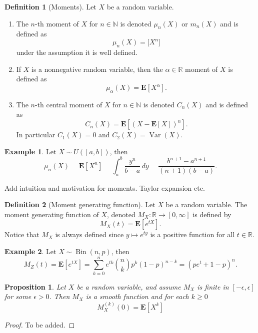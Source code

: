 \documentclass[11pt,a4paper]{article}
\theoremstyle{definition}
\newtheorem{definition}{Definition}[section]
\newtheorem{example}{Example}[section]
\theoremstyle{plain}
\newtheorem{proposition}[theorem]{Proposition}
\DeclareMathOperator{\Bin}{Bin}
\DeclareMathOperator{\Var}{Var}
\newcommand{\N}{\mathbb{N}}
\newcommand{\R}{\mathbb{R}}
\newcommand{\E}{\mathbf{E}}
\begin{document}
  \begin{definition}[Moments]
    Let $X$ be a random variable.
    \begin{enumerate}
      \item The $n$-th moment of $X$ for $n \in \N$ is denoted $\mu_n(X)$ or
      $m_n(X)$ and is defined as
      \[
        \mu_n(X) = \mathbf[X^n]
      \]
      under the assumption it is well defined.
      \item If $X$ is a nonnegative random variable, then the $\alpha \in \R$
      moment of $X$ is defined as
      \[
        \mu_\alpha(X) = \E[X^{\alpha}].
      \]
      \item The $n$-th central moment of $X$ for $n \in \N$ is denoted
      $C_n(X)$ and is defined as
      \[
        C_n(X) = \E\left[(X - \E[X])^n\right].
      \]
      In particular $C_1(X) = 0$ and $C_2(X) = \Var(X)$.
    \end{enumerate}
  \end{definition}

  \begin{example}
    Let $X \sim U([a,b])$, then
    \[
      \mu_{n} \left(X\right) =
      \E[X^{n}] =
      \int_{a}^{b}{\frac{y^{n}}{b-a}}\,dy =
      {\frac{b^{n+1}-a^{n+1}}{(n+1)(b-a)}}.
    \]
  \end{example}
  
  Add intuition and motivation for moments. Taylor expansion etc.

  \begin{definition}[Moment generating function]
    Let $X$ be a random variable. The moment generating function of $X$,
    denoted $M_X \colon \R \to [0,\infty]$ is defined by
    \[
      M_X(t) = \E\left[e^{tX}\right].
    \]
    Notice that $M_X$ is always defined since $y \mapsto e^{ty}$ is a positive
    function for all $t \in \R$.
  \end{definition}

  \begin{example}
    Let $X \sim \Bin(n,p)$, then
    \[
      M_Z(t) =
      \E\left[e^{tX}\right] =
      \sum_{k=0}^{n}e^{t k}{\binom{n}{k}}p^{k}(1-p)^{n-k} =
      \left(p e^{t}+1-p\right)^{n}.
    \]
  \end{example}

  \begin{proposition}
    Let $X$ be a random variable, and assume $M_X$ is finite in 
    $[-\epsilon, \epsilon]$ for some $\epsilon > 0$. Then $M_X$ is a smooth
    function and for each $k \geq 0$
    \[
      M_X^{(k)}(0) = \E\left[X^k\right]
    \]
  \end{proposition}
  \begin{proof}
    To be added.
  \end{proof}
\end{document}
